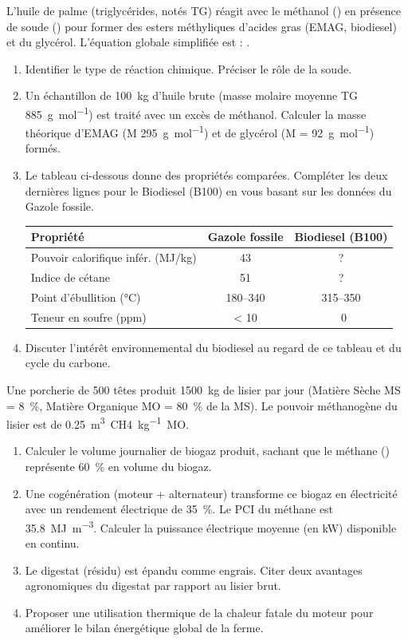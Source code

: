 \documentclass[11pt]{article}
\begin{document}
\begin{exercice}
L'huile de palme (triglycérides, notés TG) réagit avec le méthanol () en présence de soude () pour former des esters méthyliques d'acides gras (EMAG, biodiesel) et du glycérol. L'équation globale simplifiée est :
.
\begin{enumerate}
    \item Identifier le type de réaction chimique. Préciser le rôle de la soude.
    \item Un échantillon de \SI{100}{kg} d'huile brute (masse molaire moyenne TG \approx \SI{885}{g.mol^{-1}}) est traité avec un excès de méthanol. Calculer la masse théorique d'EMAG (M \approx \SI{295}{g.mol^{-1}}) et de glycérol (M = \SI{92}{g.mol^{-1}}) formés.
    \item Le tableau ci-dessous donne des propriétés comparées. Compléter les deux dernières lignes pour le Biodiesel (B100) en vous basant sur les données du Gazole fossile.
    \begin{tabular}{|l|c|c|}
    \hline
    \textbf{Propriété} & \textbf{Gazole fossile} & \textbf{Biodiesel (B100)} \\
    \hline
    Pouvoir calorifique infér. (MJ/kg) & 43 & ? \\
    Indice de cétane & 51 & ? \\
    Point d'ébullition (°C) & 180--340 & 315--350 \\
    Teneur en soufre (ppm) & < 10 & ~0 \\
    \hline
    \end{tabular}
    \item Discuter l'intérêt environnemental du biodiesel au regard de ce tableau et du cycle du carbone.
\end{enumerate}
\end{exercice}

\begin{exercice}
Une porcherie de 500 têtes produit \SI{1500}{kg} de lisier par jour (Matière Sèche MS = \SI{8}{\%}, Matière Organique MO = \SI{80}{\%} de la MS). Le pouvoir méthanogène du lisier est de \SI{0,25}{m^3 CH4.kg^{-1} MO}.
\begin{enumerate}
    \item Calculer le volume journalier de biogaz produit, sachant que le méthane () représente \SI{60}{\%} en volume du biogaz.
    \item Une cogénération (moteur + alternateur) transforme ce biogaz en électricité avec un rendement électrique de \SI{35}{\%}. Le PCI du méthane est \SI{35,8}{MJ.m^{-3}}. Calculer la puissance électrique moyenne (en kW) disponible en continu.
    \item Le digestat (résidu) est épandu comme engrais. Citer deux avantages agronomiques du digestat par rapport au lisier brut.
    \item Proposer une utilisation thermique de la chaleur fatale du moteur pour améliorer le bilan énergétique global de la ferme.
\end{enumerate}
\end{exercice}
\end{document}
